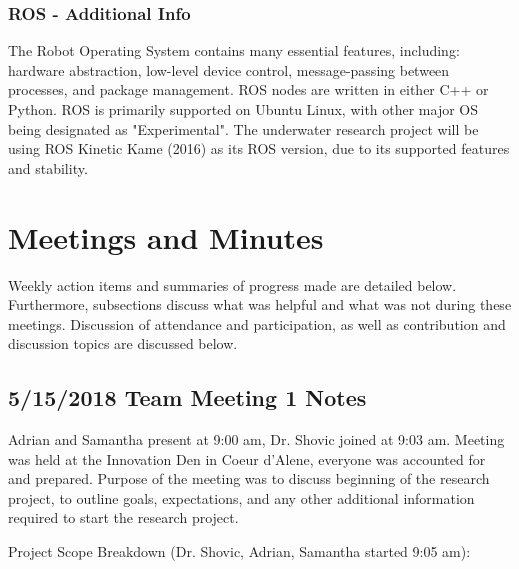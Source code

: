 \documentclass[12pt]{article}
\begin{document}
		\subsubsection{ROS - Additional Info}
		The Robot Operating System contains many essential features, including: hardware abstraction, low-level device control, message-passing between processes, and package management. ROS nodes are written in either C++ or Python. ROS is primarily supported on Ubuntu Linux, with other major OS being designated as "Experimental". The underwater research project will be using ROS Kinetic Kame (2016) as its ROS version, due to its supported features and stability. 
		
		\newpage
	
	\section{Meetings and Minutes}
	Weekly action items and summaries of progress made are detailed below. Furthermore, subsections discuss what was helpful and what was not during these meetings. Discussion of attendance and participation, as well as contribution and discussion topics are discussed below.
	
		\subsection{5/15/2018 Team Meeting 1 Notes}
		
			\noindent
			Adrian and Samantha present at 9:00 am, Dr. Shovic joined at 9:03 am. Meeting was held at the Innovation Den in Coeur d'Alene, everyone was accounted for and prepared. Purpose of the meeting was to discuss beginning of the research project, to outline goals, expectations, and any other additional information required to start the research project.
		
			\noindent
			Project Scope Breakdown (Dr. Shovic, Adrian, Samantha started 9:05 am):
			
\end{document}
